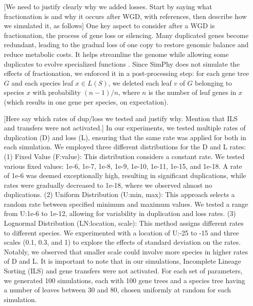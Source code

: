 \documentclass[10pt]{article}
\newcommand{\ml}[1]{\begingroup\color{blue}#1\endgroup}
\newcommand{\rk}[1]{\begingroup\color{red}#1\endgroup}
\begin{document}
\ml{[We need to justify clearly why we added losses.  Start by saying what fractionation is and why it occurs after WGD, with references, then describe how we simulated it, as follows]}
\rk{One key aspect to consider after a WGD is fractionation, the process of gene loss or silencing. Many duplicated genes become redundant, leading to the gradual loss of one copy to restore genomic balance and reduce metabolic costs. It helps streamline the genome while allowing some duplicates to evolve specialized functions \cite{lynch2000evolutionary, birchler2007gene} .}
Since SimPhy does not simulate the effects of fractionation, we enforced it in a post-processing step: for each gene tree $G$ and each species leaf $x \in L(S)$, we deleted each leaf $v$ of $G$ belonging to species $x$ with probability $(n - 1)/n$, where $n$ is the number of leaf genes in $x$ (which results in one gene per species, on expectation).

\ml{[Here say which rates of dup/loss we tested and justify why.  Mention that ILS and transfers were not activated.]}
\rk{In our experiments, we tested multiple rates of duplication (D) and loss (L), ensuring that the same rate was applied for both in each simulation. We employed three different distributions for the D and L rates: (1) Fixed Value (F:value): This distribution considers a constant rate. We tested various fixed values: 1e-6, 1e-7, 1e-8, 1e-9, 1e-10, 1e-11, 1e-15, and 1e-18. A rate of 1e-6 was deemed exceptionally high, resulting in significant duplications, while rates were gradually decreased to 1e-18, where we observed almost no duplications. (2) Uniform Distribution (U:min, max): This approach selects a random rate between specified minimum and maximum values. We tested a range from U:1e-6 to 1e-12, allowing for variability in duplication and loss rates. (3) Lognormal Distribution (LN:location, scale): This method assigns different rates to different species. We experimented with a location of U:-25 to -15 and three scales (0.1, 0.3, and 1) to explore the effects of standard deviation on the rates. Notably, we observed that smaller scale could involve more species in higher rates of D and L.
It is important to note that in our simulations, Incomplete Lineage Sorting (ILS) and gene transfers were not activated.}
For each set of parameters, we generated 100 simulations, each with 100 gene trees and a species tree having a number of leaves between 30 and 80, chosen uniformly at random for each simulation.
\end{document}
